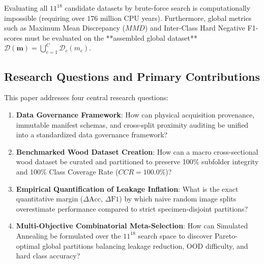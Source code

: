 Evaluating all $11^{18}$ candidate datasets by brute-force search is computationally impossible (requiring over $176$ million CPU years). Furthermore, global metrics such as Maximum Mean Discrepancy ($MMD$) and Inter-Class Hard Negative F1-scores must be evaluated on the **assembled global dataset** $\mathcal{D}(\boldsymbol{m}) = \bigcup_{c=1}^C \mathcal{D}_c(m_c)$.

\subsection{Research Questions and Primary Contributions}
This paper addresses four central research questions:
\begin{enumerate}[label=\textbf{RQ\arabic*:}, leftmargin=*]
\item \textbf{Data Governance Framework}: How can physical acquisition provenance, immutable manifest schemas, and cross-split proximity auditing be unified into a standardized data governance framework?
\item \textbf{Benchmarked Wood Dataset Creation}: How can a macro cross-sectional wood dataset be curated and partitioned to preserve 100\% subfolder integrity and 100\% Class Coverage Rate ($CCR = 100.0\%$)?
\item \textbf{Empirical Quantification of Leakage Inflation}: What is the exact quantitative margin ($\Delta \text{Acc}$, $\Delta \text{F1}$) by which naive random image splits overestimate performance compared to strict specimen-disjoint partitions?
\item \textbf{Multi-Objective Combinatorial Meta-Selection}: How can Simulated Annealing be formulated over the $11^{18}$ search space to discover Pareto-optimal global partitions balancing leakage reduction, OOD difficulty, and hard class accuracy?
\end{enumerate}

